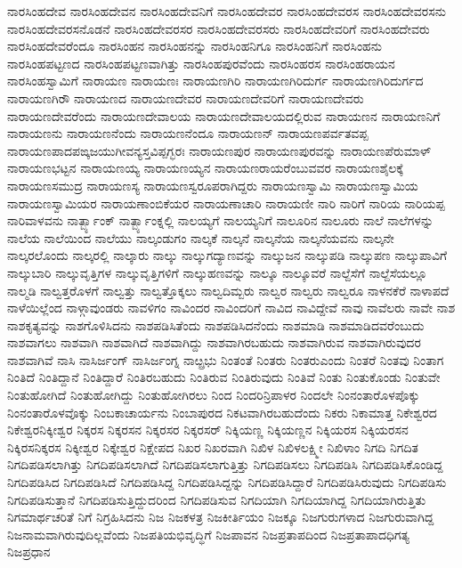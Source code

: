 {ನಾರಸಿಂಹದೇವ
ನಾರಸಿಂಹದೇವನ
ನಾರಸಿಂಹದೇವನಿಗೆ
ನಾರಸಿಂಹದೇವರ
ನಾರಸಿಂಹದೇವರಸ
ನಾರಸಿಂಹದೇವರಸನು
ನಾರಸಿಂಹದೇವರಸನೊಡನೆ
ನಾರಸಿಂಹದೇವರಸರ
ನಾರಸಿಂಹದೇವರಸರು
ನಾರಸಿಂಹದೇವರಿಗೆ
ನಾರಸಿಂಹದೇವರು
ನಾರಸಿಂಹದೇವರೆಂದೂ
ನಾರಸಿಂಹನ
ನಾರಸಿಂಹನನ್ನು
ನಾರಸಿಂಹನಿಗೂ
ನಾರಸಿಂಹನಿಗೆ
ನಾರಸಿಂಹನು
ನಾರಸಿಂಹಪಟ್ಟಣದ
ನಾರಸಿಂಹಪಟ್ಟಣವಾಗಿತ್ತು
ನಾರಸಿಂಹಪುರವೆಂದು
ನಾರಸಿಂಹರಸ
ನಾರಸಿಂಹರಾಯನ
ನಾರಸಿಂಹಸ್ವಾಮಿಗೆ
ನಾರಾಯಣ
ನಾರಾಯಣಃ
ನಾರಾಯಣಗಿರಿ
ನಾರಾಯಣಗಿರಿದುರ್ಗ
ನಾರಾಯಣಗಿರಿದುರ್ಗದ
ನಾರಾಯಣಗಿರೌ
ನಾರಾಯಣದ
ನಾರಾಯಣದೇವರ
ನಾರಾಯಣದೇವರಿಗೆ
ನಾರಾಯಣದೇವರು
ನಾರಾಯಣದೇವರೆಂದು
ನಾರಾಯಣದೇವಾಲಯ
ನಾರಾಯಣದೇವಾಲಯದಲ್ಲಿರುವ
ನಾರಾಯಣನ
ನಾರಾಯಣನಿಗೆ
ನಾರಾಯಣನು
ನಾರಾಯಣನೆಂದು
ನಾರಾಯಣನೆಂದೂ
ನಾರಾಯಣನ್
ನಾರಾಯಣಪರ್ವತವಪ್ಪ
ನಾರಾಯಣಪಾದಪಙ್ಕಜಯುಗೀವನ್ಯಸ್ತವಿಪ್ಪಗ್ಭರಃ
ನಾರಾಯಣಪುರ
ನಾರಾಯಣಪುರವನ್ನು
ನಾರಾಯಣಪೆರುಮಾಳ್
ನಾರಾಯಣಭಟ್ಟನ
ನಾರಾಯಣಯ್ಯ
ನಾರಾಯಣಯ್ಯನ
ನಾರಾಯಣರಾಯರೆಂಬುವವರ
ನಾರಾಯಣಶೈಲಕ್ಕೆ
ನಾರಾಯಣಸಮುದ್ರ
ನಾರಾಯಣಸ್ಯ
ನಾರಾಯಣಸ್ವರೂಪರಾಗಿದ್ದರು
ನಾರಾಯಣಸ್ವಾಮಿ
ನಾರಾಯಣಸ್ವಾಮಿಯ
ನಾರಾಯಣಸ್ವಾಮಿಯರ
ನಾರಾಯಣಾಂಬಿಕೆಯರ
ನಾರಾಯಣಾಚಾರಿ
ನಾರಾಯಣೀ
ನಾರಿ
ನಾರಿಗೆ
ನಾರಿಯ
ನಾರಿಯಪ್ಪ
ನಾರಿವಾಳವನು
ನಾರ್ತ್ಬ್ಯಾಂಕ್
ನಾರ್ತ್ಬ್ಯಾಂಕ್ನಲ್ಲಿ
ನಾಲಯ್ಯಗೆ
ನಾಲಯ್ಯನಿಗೆ
ನಾಲೂರಿನ
ನಾಲೂರು
ನಾಲೆ
ನಾಲೆಗಳನ್ನು
ನಾಲೆಯ
ನಾಲೆಯಿಂದ
ನಾಲೆಯು
ನಾಲ್ಕಂಡುಗಂ
ನಾಲ್ಕಕೆ
ನಾಲ್ಕನೆ
ನಾಲ್ಕನೆಯ
ನಾಲ್ಕನೆಯವನು
ನಾಲ್ಕನೇ
ನಾಲ್ಕರಲೊಂದು
ನಾಲ್ಕರಲ್ಲಿ
ನಾಲ್ಕಾರು
ನಾಲ್ಕು
ನಾಲ್ಕುಗದ್ಯಾಣವನ್ನು
ನಾಲ್ಕುಜನ
ನಾಲ್ಕುಪಡಿ
ನಾಲ್ಕುಪಣ
ನಾಲ್ಕುಪಾವಿಗೆ
ನಾಲ್ಕುಬಾರಿ
ನಾಲ್ಕುವೃತ್ತಿಗಳ
ನಾಲ್ಕುವೃತ್ತಿಗಳಿಗೆ
ನಾಲ್ಕುಹಣವನ್ನು
ನಾಲ್ಕೂ
ನಾಲ್ಕೂವರೆ
ನಾಲ್ದೆಸೆಗೆ
ನಾಲ್ದೆಸೆಯಲ್ಲೂ
ನಾಲ್ಮಡಿ
ನಾಲ್ವತ್ತರೊಳಗೆ
ನಾಲ್ವತ್ತು
ನಾಲ್ವತ್ತೊಕ್ಕಲು
ನಾಲ್ವದಿಮ್ಬರು
ನಾಲ್ವರ
ನಾಲ್ವರು
ನಾಲ್ವರೂ
ನಾಳನಕೆರೆ
ನಾಳಾಪದೆ
ನಾಳೆಯಿಲ್ಲೆಂದ
ನಾಳ್ಗಾವುಂಡರು
ನಾವಳಿಗಂ
ನಾವಿಂದರ
ನಾವಿಂದರಿಗೆ
ನಾವಿದ
ನಾವಿದ್ದೇವೆ
ನಾವು
ನಾವೆಲರು
ನಾವೇ
ನಾಶ
ನಾಶಕೃತ್ಯವನ್ನು
ನಾಶಗೊಳಿಸಿದನು
ನಾಶಪಡಿಸಿತೆಂದು
ನಾಶಪಡಿಸಿದನೆಂದು
ನಾಶಮಾಡಿ
ನಾಶಮಾಡಿದವರೆಂಬುದು
ನಾಶವಾಗಲು
ನಾಶವಾಗಿ
ನಾಶವಾಗಿದೆ
ನಾಶವಾಗಿದ್ದು
ನಾಶವಾಗಿರಬಹುದು
ನಾಶವಾಗಿರುವ
ನಾಶವಾಗಿರುವುದರ
ನಾಶವಾಗಿವೆ
ನಾಸಿ
ನಾಸಿರ್ಜಂಗ್
ನಾಸಿರ್ಜಂಗ್ನ
ನಾೞ್ಪ್ರಭು
ನಿಂತಂತೆ
ನಿಂತರು
ನಿಂತರುಎಂದು
ನಿಂತರೆ
ನಿಂತವು
ನಿಂತಾಗ
ನಿಂತಿದೆ
ನಿಂತಿದ್ದಾನೆ
ನಿಂತಿದ್ದಾರೆ
ನಿಂತಿರಬಹುದು
ನಿಂತಿರುವ
ನಿಂತಿರುವುದು
ನಿಂತಿವೆ
ನಿಂತು
ನಿಂತುಕೊಂಡು
ನಿಂತುವೇ
ನಿಂತುಹೋಗಿದೆ
ನಿಂತುಹೋಗಿದ್ದು
ನಿಂತುಹೋಗಿರಲು
ನಿಂದ
ನಿಂದರಿನ್ರಿಪಾಳರ
ನಿಂದಲೇ
ನಿಂನಂತಾರೊಳಪೊಕ್ಕು
ನಿಂನಂತಾರೊಳವೊಕ್ಕು
ನಿಂಬಕಾಚಾರ್ಯನು
ನಿಂಬಾಪುರದ
ನಿಕಟವಾಗಿರಬಹುದೆಂದು
ನಿಕರು
ನಿಕಾಮಾತ್ತ
ನಿಕೇಶ್ವರದ
ನಿಕೇಶ್ವರನಿಕ್ಕೀಶ್ವರ
ನಿಕ್ಕರಸ
ನಿಕ್ಕರಸನ
ನಿಕ್ಕರಸರ
ನಿಕ್ಕರಸರ್
ನಿಕ್ಕಿಯಣ್ಣ
ನಿಕ್ಕಿಯಣ್ಣನ
ನಿಕ್ಕಿಯರಸ
ನಿಕ್ಕಿಯರಸನ
ನಿಕ್ಕಿರಸನಿಕ್ಕರಸ
ನಿಕ್ಕೀಶ್ವರ
ನಿಕ್ಕೇಶ್ವರ
ನಿಕ್ಷೇಪದ
ನಿಖರ
ನಿಖರವಾಗಿ
ನಿಖಿಳ
ನಿಖಿಳಲಕ್ಷ್ಮೀ
ನಿಖಿಳಾಂ
ನಿಗದಿ
ನಿಗದಿತ
ನಿಗದಿಪಡಿಸಲಾಗಿತ್ತು
ನಿಗದಿಪಡಿಸಲಾಗಿದೆ
ನಿಗದಿಪಡಿಸಲಾಗುತ್ತಿತ್ತು
ನಿಗದಿಪಡಿಸಲು
ನಿಗದಿಪಡಿಸಿ
ನಿಗದಿಪಡಿಸಿಕೊಂಡಿದ್ದ
ನಿಗದಿಪಡಿಸಿದ
ನಿಗದಿಪಡಿಸಿದೆ
ನಿಗದಿಪಡಿಸಿದ್ದ
ನಿಗದಿಪಡಿಸಿದ್ದನ್ನು
ನಿಗದಿಪಡಿಸಿದ್ದಾರೆ
ನಿಗದಿಪಡಿಸಿರುವುದು
ನಿಗದಿಪಡಿಸು
ನಿಗದಿಪಡಿಸುತ್ತಾನೆ
ನಿಗದಿಪಡಿಸುತ್ತಿದ್ದುದರಿಂದ
ನಿಗದಿಪಡಿಸುವ
ನಿಗದಿಯಾಗಿ
ನಿಗದಿಯಾಗಿದ್ದ
ನಿಗದಿಯಾಗಿರುತ್ತಿತು
ನಿಗಮಾರ್ಥಚರಿತೆ
ನಿಗೆ
ನಿಗ್ರಹಿಸಿದನು
ನಿಜ
ನಿಜಕಳತ್ರ
ನಿಜಕೀರ್ತಿಯಂ
ನಿಜಕ್ಕೂ
ನಿಜಗುರುಗಳಾದ
ನಿಜಗುರುವಾಗಿದ್ದ
ನಿಜನಾಮವಾಗಿರುವುದಿಲ್ಲವೆಂದು
ನಿಜಪತಿಯಭಿವೃದ್ಧಿಗೆ
ನಿಜಪಾವನ
ನಿಜಪ್ರತಾಪದಿಂದ
ನಿಜಪ್ರತಾಪಾದಧಿಗತ್ಯ
ನಿಜಪ್ರಧಾನ
}
